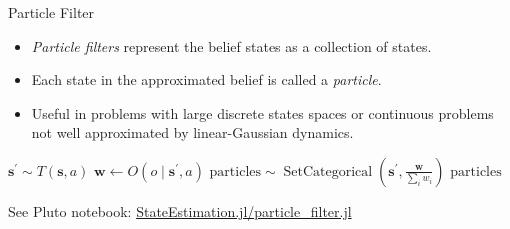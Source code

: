 \begin{frame}[fragile]{Particle Filter}


\begin{itemize}
    \item \textit{Particle filters} represent the belief states as a collection of states.
    \item Each state in the approximated belief is called a \textit{particle}.
    \item Useful in problems with large discrete states spaces or continuous problems not well approximated by linear-Gaussian dynamics.
\end{itemize}

\pause
\setcounter{algorithm}{0}
\begin{algorithm}[H]
    \caption{Particle filter algorithm.}
    \label{alg:particle_filter}
    \begin{algorithmic}
    \pause \State $\mathbf{s}^\prime \sim T(\mathbf{s}, a)$ 
    \pause \State $\mathbf{w} \leftarrow O(o \mid \mathbf{s}^\prime, a)$ 
    \pause \State $\text{particles} \sim \operatorname{SetCategorical}\left(\mathbf{s}^\prime, \frac{\mathbf{w}}{\sum_i w_i}\right)$ 
    \pause \State \Return $\text{particles}$
    \EndFunction
    \end{algorithmic}
\end{algorithm}

\pause See Pluto notebook: \href{http://htmlview.glitch.me/?https://raw.githubusercontent.com/mossr/StateEstimation.jl/master/html/particle_filter.html}{\color{cardinal}StateEstimation.jl/particle\_filter.jl}

\end{frame}